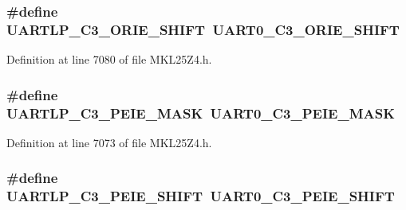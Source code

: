 \subsubsection[{\texorpdfstring{U\+A\+R\+T\+L\+P\+\_\+\+C3\+\_\+\+O\+R\+I\+E\+\_\+\+S\+H\+I\+FT}{UARTLP_C3_ORIE_SHIFT}}]{\setlength{\rightskip}{0pt plus 5cm}\#define U\+A\+R\+T\+L\+P\+\_\+\+C3\+\_\+\+O\+R\+I\+E\+\_\+\+S\+H\+I\+FT~{\bf U\+A\+R\+T0\+\_\+\+C3\+\_\+\+O\+R\+I\+E\+\_\+\+S\+H\+I\+FT}}\hypertarget{group___backward___compatibility___symbols_gad69f41c3e7e8bd2086748eb86a967220}{}\label{group___backward___compatibility___symbols_gad69f41c3e7e8bd2086748eb86a967220}


Definition at line 7080 of file M\+K\+L25\+Z4.\+h.

\subsubsection[{\texorpdfstring{U\+A\+R\+T\+L\+P\+\_\+\+C3\+\_\+\+P\+E\+I\+E\+\_\+\+M\+A\+SK}{UARTLP_C3_PEIE_MASK}}]{\setlength{\rightskip}{0pt plus 5cm}\#define U\+A\+R\+T\+L\+P\+\_\+\+C3\+\_\+\+P\+E\+I\+E\+\_\+\+M\+A\+SK~{\bf U\+A\+R\+T0\+\_\+\+C3\+\_\+\+P\+E\+I\+E\+\_\+\+M\+A\+SK}}\hypertarget{group___backward___compatibility___symbols_ga4cc8bfb380818563bdfa2f98fbde7710}{}\label{group___backward___compatibility___symbols_ga4cc8bfb380818563bdfa2f98fbde7710}


Definition at line 7073 of file M\+K\+L25\+Z4.\+h.

\subsubsection[{\texorpdfstring{U\+A\+R\+T\+L\+P\+\_\+\+C3\+\_\+\+P\+E\+I\+E\+\_\+\+S\+H\+I\+FT}{UARTLP_C3_PEIE_SHIFT}}]{\setlength{\rightskip}{0pt plus 5cm}\#define U\+A\+R\+T\+L\+P\+\_\+\+C3\+\_\+\+P\+E\+I\+E\+\_\+\+S\+H\+I\+FT~{\bf U\+A\+R\+T0\+\_\+\+C3\+\_\+\+P\+E\+I\+E\+\_\+\+S\+H\+I\+FT}}\hypertarget{group___backward___compatibility___symbols_gacaf37722e62340c548104406df0bcc64}{}\label{group___backward___compatibility___symbols_gacaf37722e62340c548104406df0bcc64}


